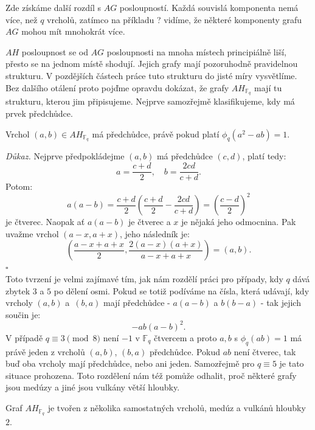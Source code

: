 \documentclass[12pt]{report}
\begin{document}
Zde získáme další rozdíl s $AG$ posloupností. Každá souvislá komponenta nemá více, než $q$ vrcholů, zatímco na příkladu ? vidíme, že některé komponenty grafu $AG$ mohou mít mnohokrát více. 

$AH$ posloupnost se od $AG$ posloupnosti na mnoha místech principiálně liší, přesto se na jednom místě shodují. Jejich grafy mají pozoruhodně pravidelnou strukturu. V pozdějších částech práce tuto strukturu do jisté míry vysvětlíme. Bez dalšího otálení proto pojďme opravdu dokázat, že grafy $AH_{\mathbb{F}_q}$ mají tu strukturu, kterou jim připisujeme. Nejprve samozřejmě klasifikujeme, kdy má prvek předchůdce.

\begin{lemma}
Vrchol $(a,b) \in AH_{\mathbb{F}_q}$ má předchůdce, právě pokud platí $\phi_q(a^2-ab)=1$.
\end{lemma}

\noindent \textit{Důkaz.} Nejprve předpokládejme $(a,b)$ má předchůdce $(c,d)$, platí tedy:
\begin{equation*}
a = \frac{c+d}{2}, \quad b = \frac{2cd}{c+d}.
\end{equation*}
Potom:
\begin{equation*}
a(a-b) = \frac{c+d}{2} \left( \frac{c+d}{2} - \frac{2cd}{c+d} \right) =\left( \frac{c-d}{2}\right)^2
\end{equation*}
je čtverec. Naopak ať $a(a-b)$ je čtverec a $x$ je nějaká jeho odmocnina. Pak uvažme vrchol $(a-x,a+x)$, jeho následník je: $$\left(\frac{a-x+a+x}{2}, \frac{2 (a-x)(a+x)}{a-x+a+x} \right)= \left(a, b \right).$$ \hfill $\square$\\

Toto tvrzení je velmi zajímavé tím, jak nám rozdělí práci pro případy, kdy $q$ dává zbytek $3$ a $5$ po dělení osmi. Pokud se totiž podíváme na čísla, která udávají, kdy vrcholy $(a,b)$ a~$(b,a)$ mají předchůdce - $a(a-b)$ a $b(b-a)$ - tak jejich součin je:
$$-ab (a-b)^2.$$  
V případě $q \equiv 3 \pmod{8}$ není $-1$ v $\mathbb{F}_q$ čtvercem a proto $a,b$ s $\phi_q (ab) = 1$ má právě jeden z vrcholů $(a,b)$, $(b,a)$ předchůdce. Pokud $ab$ není čtverec, tak buď oba vrcholy mají předchůdce, nebo ani jeden. Samozřejmě pro $q \equiv 5$ je tato situace prohozena. Toto rozdělení nám též pomůže odhalit, proč některé grafy jsou medúzy a jiné jsou vulkány větší hloubky.
\begin{veta}
Graf $AH_{\mathbb{F}_q}$ je tvořen z několika samostatných vrcholů, medúz a vulkánů hloubky $2$.
\end{veta}
\end{document}
